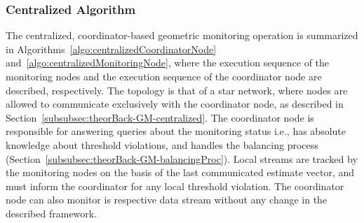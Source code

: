{\centering
{}
}


\subsubsection{Centralized Algorithm} \label{subsubsec:theorBack-GM-centralizedAlgo}

The centralized, coordinator-based geometric monitoring operation is summarized in Algorithms~\ref{algo:centralizedCoordinatorNode} and~\ref{algo:centralizedMonitoringNode}, where the execution sequence of the monitoring nodes and the execution sequence of the coordinator node are described, respectively. The topology is that of a star network, where nodes are allowed to communicate exclusively with the coordinator node, as described in Section~\ref{subsubsec:theorBack-GM-centralized}. The coordinator node is responsible for answering queries about the monitoring status i.e., has absolute knowledge about threshold violations, and handles the balancing process (Section~\ref{subsubsec:theorBack-GM-balancingProc}). Local streams are tracked by the monitoring nodes on the basis of the last communicated estimate vector, and must inform the coordinator for any local threshold violation. The coordinator node can also monitor is respective data stream without any change in the described framework.\\

